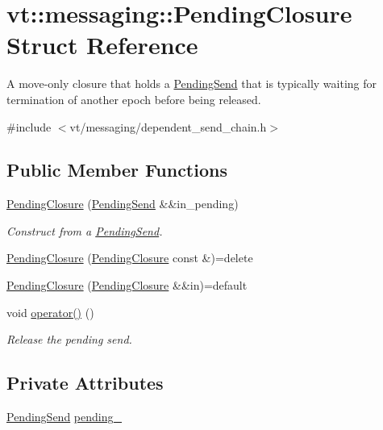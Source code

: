 \hypertarget{structvt_1_1messaging_1_1_pending_closure}{}\section{vt\+:\+:messaging\+:\+:Pending\+Closure Struct Reference}
\label{structvt_1_1messaging_1_1_pending_closure}


A move-\/only closure that holds a {\ttfamily \hyperlink{structvt_1_1messaging_1_1_pending_send}{Pending\+Send}} that is typically waiting for termination of another epoch before being released.  




{\ttfamily \#include $<$vt/messaging/dependent\+\_\+send\+\_\+chain.\+h$>$}

\subsection*{Public Member Functions}
\begin{DoxyCompactItemize}
\item 
\hyperlink{structvt_1_1messaging_1_1_pending_closure_aabf555d7b42f5d663b1ad499f09db9d4}{Pending\+Closure} (\hyperlink{structvt_1_1messaging_1_1_pending_send}{Pending\+Send} \&\&in\+\_\+pending)
\begin{DoxyCompactList}\small\item\em Construct from a {\ttfamily \hyperlink{structvt_1_1messaging_1_1_pending_send}{Pending\+Send}}. \end{DoxyCompactList}\item 
\hyperlink{structvt_1_1messaging_1_1_pending_closure_a3e703c1f2ff98d8e1a04ad4306a1f011}{Pending\+Closure} (\hyperlink{structvt_1_1messaging_1_1_pending_closure}{Pending\+Closure} const \&)=delete
\item 
\hyperlink{structvt_1_1messaging_1_1_pending_closure_aa0e2748116e95dd60b31ebfc6a5334c3}{Pending\+Closure} (\hyperlink{structvt_1_1messaging_1_1_pending_closure}{Pending\+Closure} \&\&in)=default
\item 
void \hyperlink{structvt_1_1messaging_1_1_pending_closure_a484d65eb7d32fde14253976927e37fd9}{operator()} ()
\begin{DoxyCompactList}\small\item\em Release the pending send. \end{DoxyCompactList}\end{DoxyCompactItemize}
\subsection*{Private Attributes}
\begin{DoxyCompactItemize}
\item 
\hyperlink{structvt_1_1messaging_1_1_pending_send}{Pending\+Send} \hyperlink{structvt_1_1messaging_1_1_pending_closure_a8a7aa220e450d45f9a7ebec04d563bdd}{pending\+\_\+}
\end{DoxyCompactItemize}


